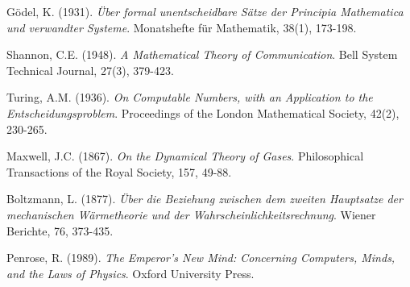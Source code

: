 \documentclass[12pt,a4paper]{article}
\begin{document}
\begin{thebibliography}{99}
Gödel, K. (1931). 
\textit{Über formal unentscheidbare Sätze der Principia Mathematica und verwandter Systeme}. 
Monatshefte für Mathematik, 38(1), 173-198.

Shannon, C.E. (1948). 
\textit{A Mathematical Theory of Communication}. 
Bell System Technical Journal, 27(3), 379-423.

Turing, A.M. (1936). 
\textit{On Computable Numbers, with an Application to the Entscheidungsproblem}. 
Proceedings of the London Mathematical Society, 42(2), 230-265.

Maxwell, J.C. (1867). 
\textit{On the Dynamical Theory of Gases}. 
Philosophical Transactions of the Royal Society, 157, 49-88.

Boltzmann, L. (1877). 
\textit{Über die Beziehung zwischen dem zweiten Hauptsatze der mechanischen Wärmetheorie und der Wahrscheinlichkeitsrechnung}. 
Wiener Berichte, 76, 373-435.

Penrose, R. (1989). 
\textit{The Emperor's New Mind: Concerning Computers, Minds, and the Laws of Physics}. 
Oxford University Press.

\end{thebibliography}
\end{document}
